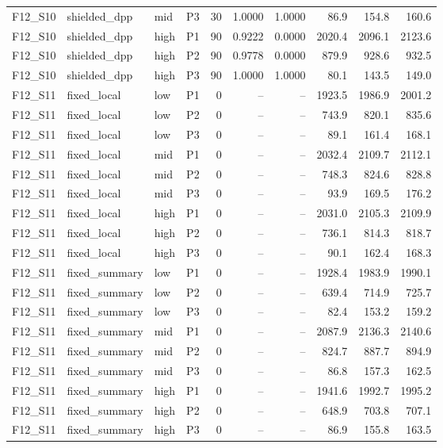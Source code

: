 \begin{longtable}{llllrrrrrr}
F12\_S10 & shielded\_dpp & mid & P3 & 30 & 1.0000 & 1.0000 & 86.9 & 154.8 & 160.6 \\
F12\_S10 & shielded\_dpp & high & P1 & 90 & 0.9222 & 0.0000 & 2020.4 & 2096.1 & 2123.6 \\
F12\_S10 & shielded\_dpp & high & P2 & 90 & 0.9778 & 0.0000 & 879.9 & 928.6 & 932.5 \\
F12\_S10 & shielded\_dpp & high & P3 & 90 & 1.0000 & 1.0000 & 80.1 & 143.5 & 149.0 \\
F12\_S11 & fixed\_local & low & P1 & 0 & -- & -- & 1923.5 & 1986.9 & 2001.2 \\
F12\_S11 & fixed\_local & low & P2 & 0 & -- & -- & 743.9 & 820.1 & 835.6 \\
F12\_S11 & fixed\_local & low & P3 & 0 & -- & -- & 89.1 & 161.4 & 168.1 \\
F12\_S11 & fixed\_local & mid & P1 & 0 & -- & -- & 2032.4 & 2109.7 & 2112.1 \\
F12\_S11 & fixed\_local & mid & P2 & 0 & -- & -- & 748.3 & 824.6 & 828.8 \\
F12\_S11 & fixed\_local & mid & P3 & 0 & -- & -- & 93.9 & 169.5 & 176.2 \\
F12\_S11 & fixed\_local & high & P1 & 0 & -- & -- & 2031.0 & 2105.3 & 2109.9 \\
F12\_S11 & fixed\_local & high & P2 & 0 & -- & -- & 736.1 & 814.3 & 818.7 \\
F12\_S11 & fixed\_local & high & P3 & 0 & -- & -- & 90.1 & 162.4 & 168.3 \\
F12\_S11 & fixed\_summary & low & P1 & 0 & -- & -- & 1928.4 & 1983.9 & 1990.1 \\
F12\_S11 & fixed\_summary & low & P2 & 0 & -- & -- & 639.4 & 714.9 & 725.7 \\
F12\_S11 & fixed\_summary & low & P3 & 0 & -- & -- & 82.4 & 153.2 & 159.2 \\
F12\_S11 & fixed\_summary & mid & P1 & 0 & -- & -- & 2087.9 & 2136.3 & 2140.6 \\
F12\_S11 & fixed\_summary & mid & P2 & 0 & -- & -- & 824.7 & 887.7 & 894.9 \\
F12\_S11 & fixed\_summary & mid & P3 & 0 & -- & -- & 86.8 & 157.3 & 162.5 \\
F12\_S11 & fixed\_summary & high & P1 & 0 & -- & -- & 1941.6 & 1992.7 & 1995.2 \\
F12\_S11 & fixed\_summary & high & P2 & 0 & -- & -- & 648.9 & 703.8 & 707.1 \\
F12\_S11 & fixed\_summary & high & P3 & 0 & -- & -- & 86.9 & 155.8 & 163.5 \\

\end{longtable}
